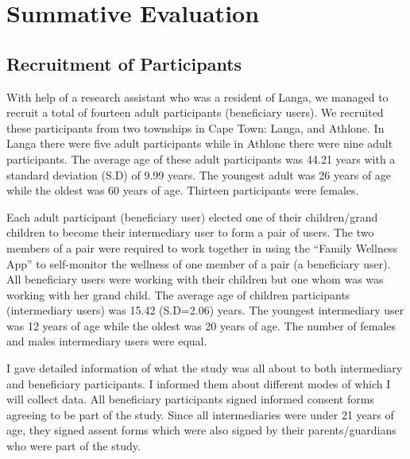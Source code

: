 
\chapter{Summative Evaluation} %

\label{summativeevalchapter} %


\section{Recruitment of Participants}
With help of a research assistant who was a resident of Langa,  we managed to recruit a total of fourteen adult participants (beneficiary users). We recruited these participants from two townships in Cape Town: Langa, and Athlone. In Langa there were five adult participants while in Athlone there were nine adult participants. The average age of these adult participants was 44.21 years with a standard deviation (S.D) of 9.99 years. The youngest adult was 26 years of age while the oldest was 60 years of age. Thirteen participants were females. 

Each adult participant (beneficiary user) elected one of their children/grand children to become their intermediary user to form a pair of users. The two members of a pair were required to work together in using the ``Family Wellness App'' to self-monitor the wellness of one member of a pair (a beneficiary user). All beneficiary users were working with their children but one whom was was working with her grand child.  The average age of children participants (intermediary users) was 15.42 (S.D=2.06) years. The youngest intermediary user was 12 years of age while the oldest was 20 years of age. The number of females and males intermediary users were equal. 

I gave detailed information of what the study was all about to both intermediary and beneficiary participants. I informed them about different modes of which I will collect data. All beneficiary participants signed informed consent forms agreeing to be part of the study. Since all intermediaries were under 21 years of age, they signed assent forms which were also signed by their parents/guardians who were part of the study.

